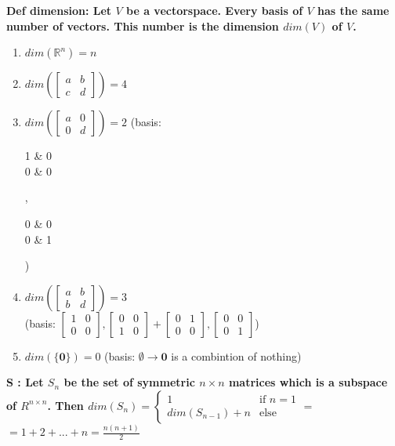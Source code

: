 \documentclass[7pt,landscape, margin = 0.1mm]{article}
\newcommand{\DEF}[2]{\color{chaptercolor}\bf{Def #1}:\color{black}    \hspace{0.2cm} #2}
\newcommand{\SA}[2]{\color{chaptercolor}\bf{S #1}:\color{black}    \hspace{0.2cm} #2}
\begin{document}
\begin{multicols}{4}
\begin{flushleft}
{{\DEF{dimension}{ Let $V$ be a vectorspace. Every basis of $V$ has the same number of vectors. This number is the dimension $dim(V)$ of $V$.
\begin{enumerate}[nolistsep]
    \item $dim(\mathbb{R}^n)=n$
    \item $dim(\begin{bmatrix}
        a & b\\
        c & d
    \end{bmatrix})=4$
    \item $dim(\begin{bmatrix}
        a & 0\\
        0 & d
    \end{bmatrix})=2$ (basis: \begin{bmatrix}
        1 & 0\\
        0 & 0
    \end{bmatrix},
    \begin{bmatrix}
        0 & 0\\
        0 & 1
    \end{bmatrix})
    \item $dim(\begin{bmatrix}
        a & b\\
        b & d
    \end{bmatrix})=3$\\ (basis: $\begin{bmatrix}
        1 & 0\\
        0 & 0
    \end{bmatrix},
    \begin{bmatrix}
        0 & 0\\
        1 & 0
    \end{bmatrix} + \begin{bmatrix}
        0 & 1\\
        0 & 0
    \end{bmatrix},
    \begin{bmatrix}
        0 & 0\\
        0 & 1
    \end{bmatrix}$)
    \item $dim(\{\bm{0}\})=0$ (basis: $\emptyset \rightarrow \bm{0}$ is a combintion of nothing)
\end{enumerate}}

\SA{}{Let $S_n$ be the set of symmetric $n\times n$ matrices which is a subspace of $R^{n\times n}$. Then $dim(S_n)=\begin{cases}
    1 & \text{if $n=1$}\\
    dim(S_{n-1}) + n & \text{else}
\end{cases}=$\\
$ = 1+2+...+n = \frac{n(n+1)}{2}$}


}}
\end{flushleft}
\end{multicols}
\end{document}
